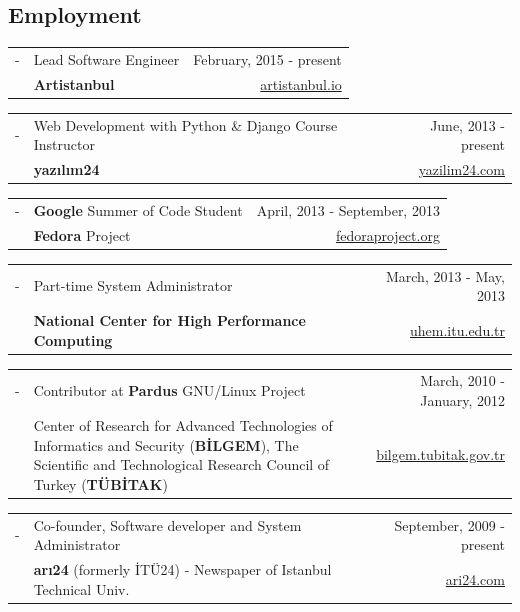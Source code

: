 \documentclass[11pt,a4paper]{article}
\renewenvironment{itemize}{
  \begin{list}{}{
    \setlength{\leftmargin}{0em}
  }
}{
  \end{list}
}
\begin{document}
\subsection*{Employment}
\begin{itemize}
\item
\begin{tabularx}{\textwidth}{l X r}
- & Lead Software Engineer & February, 2015 - present\\
& \textbf{Artistanbul} & \href{https://www.artistanbul.io/}{artistanbul.io}
\end{tabularx}
\item
\begin{tabularx}{\textwidth}{l X r}
- & Web Development with Python \& Django Course Instructor & June, 2013 - present\\
& \textbf{yazılım24} & \href{http://yazilim24.com/}{yazilim24.com}
\end{tabularx}
\item
\begin{tabularx}{\textwidth}{l X r}
- & \textbf{Google} Summer of Code Student & April, 2013 - September, 2013\\
& \textbf{Fedora} Project & \href{http://fedoraproject.org/}{fedoraproject.org}
\end{tabularx}
\item
\begin{tabularx}{\textwidth}{l X r}
- & Part-time System Administrator & March, 2013 - May, 2013\\
& \textbf{National Center for High Performance Computing} & \href{http://www.uhem.itu.edu.tr/}{uhem.itu.edu.tr}
\end{tabularx}
\item
\begin{tabularx}{\textwidth}{l X r}
- & Contributor at \textbf{Pardus} GNU/Linux Project & March, 2010 - January, 2012\\
& Center of Research for Advanced Technologies of Informatics and Security (\textbf{BİLGEM}), The Scientific and Technological Research Council of Turkey (\textbf{TÜBİTAK}) & \href{http://bilgem.tubitak.gov.tr}{bilgem.tubitak.gov.tr}
\end{tabularx}
\item
\begin{tabularx}{\textwidth}{l X r}
- & Co-founder, Software developer and System Administrator & September, 2009 - present\\
& \textbf{arı24} (formerly İTÜ24) - Newspaper of Istanbul Technical Univ. & \href{http://ari24.com}{ari24.com}
\end{tabularx}
\end{itemize}
\end{document}
